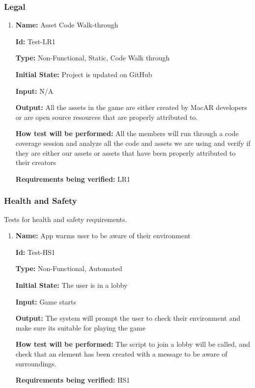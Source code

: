 \documentclass[12pt, titlepage]{article}
\begin{document}
\subsubsection{Legal}

\begin{enumerate}

\item{\textbf{Name:} Asset Code Walk-through} \label{itm:Test-LR1}

\textbf{Id:} Test-LR1

\textbf{Type:} Non-Functional, Static, Code Walk through
					
\textbf{Initial State:} Project is updated on GitHub
					
\textbf{Input:} N/A
					
\textbf{Output:} All the assets in the game are either created by MacAR developers or are open source resources that are properly attributed to. 
					
\textbf{How test will be performed:} All the members will run through a code coverage session and analyze all the code and assets we are using and verify if they are either our assets or assets that have been properly attributed to their creators

\textbf{Requirements being verified:} LR1
					
\end{enumerate}

\subsubsection{Health and Safety}
Tests for health and safety requirements. 

\begin{enumerate}

\item{\textbf{Name:} App warms user to be aware of their environment} \label{itm:Test-HS1}

\textbf{Id:} Test-HS1

\textbf{Type:} Non-Functional, Automated
					
\textbf{Initial State:} The user is in a lobby
					
\textbf{Input:} Game starts
					
\textbf{Output:} The system will prompt the user to check their environment and make sure its suitable for playing the game
					
\textbf{How test will be performed:} The script to join a lobby will be called, and check that an element has been created with a message to be aware of surroundings. 

\textbf{Requirements being verified:} HS1
\end{enumerate}
\end{document}
